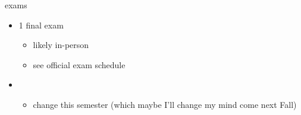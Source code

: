 \begin{frame}{exams}
    \begin{itemize}
    \item 1 final exam
        \begin{itemize}
        \item likely in-person
        \item see official exam schedule
        \end{itemize}
    \item {}
        \begin{itemize}
        \item change this semester (which maybe I'll change my mind come next Fall)
        \end{itemize}
    \end{itemize}
\end{frame}

